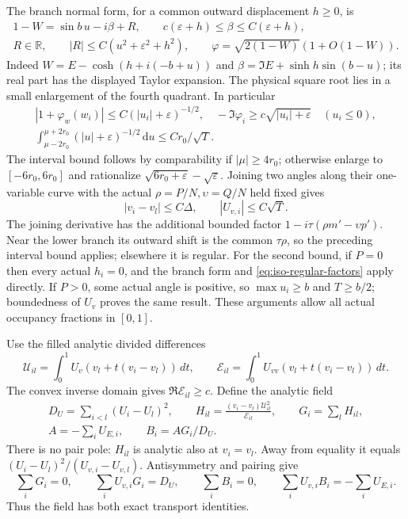 \documentclass[11pt]{article}
\numberwithin{equation}{section}
\theoremstyle{definition}
\newcommand{\dd}{\,\mathrm d}
\newcommand{\eps}{\varepsilon}
\begin{document}
The branch normal form, for a common outward displacement $h\ge0$,
is
\begin{equation}\label{eq:iso-branch-normal}
 \begin{gathered}
 1-W=\sin b\,u-i\beta+R,\qquad
 c(\eps+h)\le\beta\le C(\eps+h),\\
 R\in\mathbb R,\qquad |R|\le C(u^2+\eps^2+h^2),\qquad
 \varphi=\sqrt{2(1-W)}(1+O(1-W)).
 \end{gathered}
\end{equation}
Indeed $W={E}-\cosh(h+i(-b+u))$ and
$\beta=\Im{E}+\sinh h\sin(b-u)$; its real part has the
displayed Taylor expansion.  The physical square root lies in a
small enlargement of the fourth quadrant.  In particular
\[
 \begin{gathered}
 |1+\varphi_w(w_i)|\le C(|u_i|+\eps)^{-1/2},\quad
 -\Im\varphi_i\ge c\sqrt{|u_i|+\eps}\quad(u_i\le0),\\
 \int_{\mu-2r_0}^{\mu+2r_0}(|u|+\eps)^{-1/2}\dd u
       \le Cr_0/\sqrt T.
 \end{gathered}
\]
The interval bound follows by comparability if $|\mu|\ge4r_0$;
otherwise enlarge to $[-6r_0,6r_0]$ and rationalize
$\sqrt{6r_0+\eps}-\sqrt\eps$.
Joining two angles along their one-variable curve with the actual
$\rho=P/N,\upsilon=Q/N$ held fixed gives
\begin{equation}\label{eq:iso-coordinate-scales}
 |v_i-v_l|\le C\Delta,\qquad |U_{v,i}|\le C\sqrt T.
\end{equation}
The joining derivative has the additional bounded factor
$1-i\tau(\rho m'-\upsilon p')$.  Near the lower branch its outward
shift is the common $\tau\rho$, so the preceding interval bound
applies; elsewhere it is regular.  For the second bound, if $P=0$
then every actual $h_i=0$, and the branch form and
\eqref{eq:iso-regular-factors} apply directly.  If $P>0$, some
actual angle is positive, so $\max u_i\ge b$ and $T\ge b/2$;
boundedness of $U_v$ proves the same result.  These arguments allow
all actual occupancy fractions in $[0,1]$.


Use the filled analytic divided differences
\[
 \mathcal U_{il}=\int_0^1U_v(v_l+t(v_i-v_l))\,dt,\qquad
 \mathcal E_{il}=\int_0^1U_{vv}(v_l+t(v_i-v_l))\,dt.
\]
The convex inverse domain gives $\Re\mathcal E_{il}\ge c$.
Define the analytic field
\begin{equation}\label{eq:iso-covariance-field}
 \begin{gathered}
 D_U=\sum_{i<l}(U_i-U_l)^2,\qquad
 H_{il}=\frac{(v_i-v_l)\mathcal U_{il}^2}{\mathcal E_{il}},
 \qquad G_i=\sum_lH_{il},\\
 A=-\sum_iU_{{E},i},\qquad B_i=AG_i/D_U.
 \end{gathered}
\end{equation}
There is no pair pole: $H_{il}$ is analytic also at $v_i=v_l$.
Away from equality it equals $(U_i-U_l)^2/(U_{v,i}-U_{v,l})$.
Antisymmetry and pairing give
\[
 \sum_iG_i=0,\qquad \sum_iU_{v,i}G_i=D_U,\qquad
 \sum_iB_i=0,\qquad \sum_iU_{v,i}B_i=-\sum_iU_{{E},i}.
\]
Thus the field has both exact transport identities.
\end{document}
